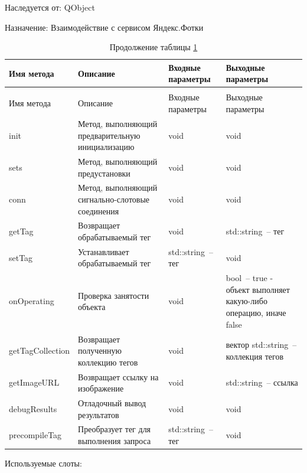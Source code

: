 \documentclass[a4paper,14pt,russian]{extreport}
\begin{document}
Наследуется от: QObject

Назначение: Взаимодействие с сервисом Яндекс.Фотки

\begin{longtable}{|m{3 cm}|m{3 cm}|m{4 cm}|m{4 cm}|}
\caption{Методы класса YandexImageConnector\label{tab:yandeximageconnector}} \\
\hline 
Имя метода & Описание & Входные параметры & Выходные параметры \\
\hline
\endfirsthead
\caption*{Продолжение таблицы \ref{tab:yandeximageconnector}} \\
\hline
Имя метода & Описание & Входные параметры & Выходные параметры \\
\endhead
init & Метод, выполняющий предварительную инициализацию & void & void \\
\hline
sets & Метод, выполняющий предустановки & void & void \\
\hline
conn & Метод, выполняющий сигнально-слотовые соединения & void & void \\
\hline
getTag & Возвращает обрабатываемый тег & void & std::string~-- тег \\
\hline
setTag & Устанавливает обрабатываемый тег & std::string~-- тег & void \\
\hline
{on\-Operating} & Проверка занятости объекта & void& bool~-- true - объект выполняет какую-либо операцию, иначе false \\
\hline
{get\-Tag\-Collection} & Возвращает полученную коллекцию тегов & void & вектор std::string~-- коллекция тегов \\
\hline
{get\-Image\-URL} & Возвращает ссылку на изображение & void & std::string~-- ссылка \\
\hline
{debug\-Results} & Отладочный вывод результатов & void & void \\
\hline
{precompile\-Tag} & Преобразует тег для выполнения запроса & std::string~-- тег & void \\
\hline
\end{longtable}

Используемые слоты:
\end{document}
